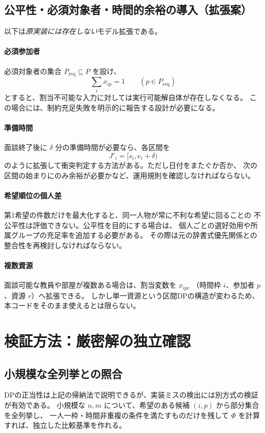 \documentclass[11pt,a4paper]{ltjsarticle}
\theoremstyle{definition}
\theoremstyle{remark}
\begin{document}
\subsection{公平性・必須対象者・時間的余裕の導入（拡張案）}
以下は\emph{原実装には存在しない}モデル拡張である。

\paragraph{必須参加者}
必須対象者の集合 $P_{\mathrm{req}}\subseteq P$ を設け、
\[
 \sum_i x_{ip}=1\qquad(p\in P_{\mathrm{req}})
\]
とすると、割当不可能な入力に対しては実行可能解自体が存在しなくなる。
この場合には、制約充足失敗を明示的に報告する設計が必要になる。

\paragraph{準備時間}
面談終了後に $\delta$ 分の準備時間が必要なら、各区間を
\[
 J'_i=[s_i,e_i+\delta)
\]
のように拡張して衝突判定する方法がある。ただし日付をまたぐか否か、
次の区間の始まりにのみ余裕が必要かなど、運用規則を確認しなければならない。

\paragraph{希望順位の個人差}
第1希望の件数だけを最大化すると、同一人物が常に不利な希望に回ることの
不公平性は評価できない。公平性を目的にする場合は、
個人ごとの選好効用や所属グループの充足率を追加する必要がある。
その際は元の辞書式優先関係との整合性を再検討しなければならない。

\paragraph{複数資源}
面談可能な教員や部屋が複数ある場合は、割当変数を $x_{ipr}$
（時間枠 $i$、参加者 $p$、資源 $r$）へ拡張できる。
しかし単一資源という区間DPの構造が変わるため、本コードをそのまま使えるとは限らない。

\section{検証方法：厳密解の独立確認}
\subsection{小規模な全列挙との照合}
DPの正当性は上記の帰納法で説明できるが、実装ミスの検出には別方式の検証が有効である。
小規模な $n,m$ について、希望のある候補 $(i,p)$ から部分集合を全列挙し、
一人一枠・時間非重複の条件を満たすものだけを残して
$\Phi$ を計算すれば、独立した比較基準を作れる。
\end{document}
